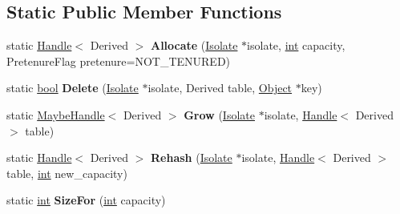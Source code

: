 \subsection*{Static Public Member Functions}
\begin{DoxyCompactItemize}
\item 
\mbox{\label{classv8_1_1internal_1_1SmallOrderedHashTable_a15786cb9d3bb12b4d8c8c63322623110}} 
static \mbox{\hyperlink{classv8_1_1internal_1_1Handle}{Handle}}$<$ Derived $>$ {\bfseries Allocate} (\mbox{\hyperlink{classv8_1_1internal_1_1Isolate}{Isolate}} $\ast$isolate, \mbox{\hyperlink{classint}{int}} capacity, Pretenure\+Flag pretenure=N\+O\+T\+\_\+\+T\+E\+N\+U\+R\+ED)
\item 
\mbox{\label{classv8_1_1internal_1_1SmallOrderedHashTable_af3df3818bc0aa92a10fbbb75d559523b}} 
static \mbox{\hyperlink{classbool}{bool}} {\bfseries Delete} (\mbox{\hyperlink{classv8_1_1internal_1_1Isolate}{Isolate}} $\ast$isolate, Derived table, \mbox{\hyperlink{classv8_1_1internal_1_1Object}{Object}} $\ast$key)
\item 
\mbox{\label{classv8_1_1internal_1_1SmallOrderedHashTable_a825238db8ee64b9aaf6fb0fe46146598}} 
static \mbox{\hyperlink{classv8_1_1internal_1_1MaybeHandle}{Maybe\+Handle}}$<$ Derived $>$ {\bfseries Grow} (\mbox{\hyperlink{classv8_1_1internal_1_1Isolate}{Isolate}} $\ast$isolate, \mbox{\hyperlink{classv8_1_1internal_1_1Handle}{Handle}}$<$ Derived $>$ table)
\item 
\mbox{\label{classv8_1_1internal_1_1SmallOrderedHashTable_a93209473ff6cec8f2137e5d3b0fb2c6f}} 
static \mbox{\hyperlink{classv8_1_1internal_1_1Handle}{Handle}}$<$ Derived $>$ {\bfseries Rehash} (\mbox{\hyperlink{classv8_1_1internal_1_1Isolate}{Isolate}} $\ast$isolate, \mbox{\hyperlink{classv8_1_1internal_1_1Handle}{Handle}}$<$ Derived $>$ table, \mbox{\hyperlink{classint}{int}} new\+\_\+capacity)
\item 
\mbox{\label{classv8_1_1internal_1_1SmallOrderedHashTable_a0a27c14486086f4289ed06502d902153}} 
static \mbox{\hyperlink{classint}{int}} {\bfseries Size\+For} (\mbox{\hyperlink{classint}{int}} capacity)
\end{DoxyCompactItemize}
